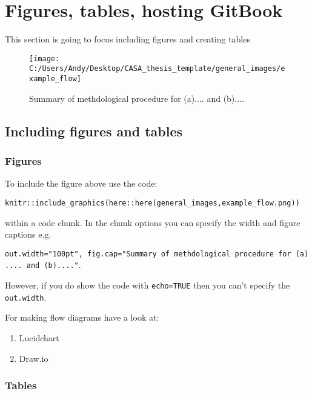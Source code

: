 \documentclass[
  12pt,
  oneside]{book}
\providecommand{\tightlist}{%
  \setlength{\itemsep}{0pt}\setlength{\parskip}{0pt}}
\begin{document}
\hypertarget{figures-tables-hosting-gitbook}{%
\chapter{Figures, tables, hosting GitBook}\label{figures-tables-hosting-gitbook}}

This section is going to focus including figures and creating tables

\begin{figure}
\texttt{[image: C:/Users/Andy/Desktop/CASA\_thesis\_template/general\_images/example\_flow]} \caption{Summary of methdological procedure for (a).... and (b)....}\label{fig:methodsflow}
\end{figure}

\hypertarget{including-figures-and-tables}{%
\section{Including figures and tables}\label{including-figures-and-tables}}

\hypertarget{figures-1}{%
\subsection{Figures}\label{figures-1}}

To include the figure above use the code:

\texttt{knitr::include\_graphics(here::here(\textquotesingle{}general\_images\textquotesingle{},\textquotesingle{}example\_flow.png\textquotesingle{}))}

within a code chunk. In the chunk options you can specify the width and figure captions e.g.~

\texttt{out.width="100pt",\ fig.cap="Summary\ of\ methdological\ procedure\ for\ (a)....\ and\ (b)...."}.

However, if you do show the code with \texttt{echo=TRUE} then you can't specify the \texttt{out.width}.

For making flow diagrams have a look at:

\begin{enumerate}
\def\labelenumi{\arabic{enumi}.}
\tightlist
\item
  Lucidchart
\item
  Draw.io
\end{enumerate}

\hypertarget{tables-1}{%
\subsection{Tables}\label{tables-1}}
\end{document}
